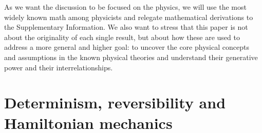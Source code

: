 \documentclass[10pt,twocolumn, nofootinbib]{revtex4-2}
\begin{document}
As we want the discussion to be focused on the physics, we will use the most widely known math among physicists and relegate mathematical derivations to the Supplementary Information. We also want to stress that this paper is not about the originality of each single result, but about how these are used to address a more general and higher goal: to uncover the core physical concepts and assumptions in the known physical theories and understand their generative power and their interrelationships. 





\section{Determinism, reversibility and Hamiltonian mechanics}
\end{document}
